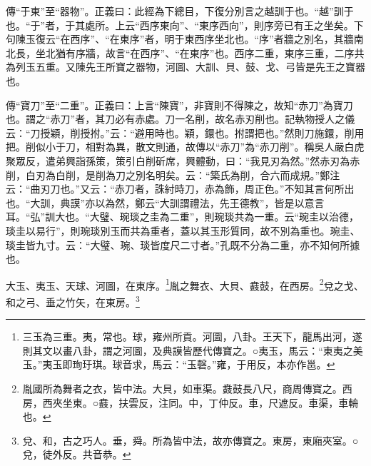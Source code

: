 {\noindent\zhuan{}\fzbyks 傳“于東”至“器物”。正義曰：此經為下總目，下復分別言之越訓于也。“越”訓于也。“于”者，于其處所。上云“西序東向”、“東序西向”，則序旁已有王之坐矣。下句陳玉復云“在西序”、“在東序”者，明于東西序坐北也。“序”者牆之別名，其牆南北長，坐北猶有序牆，故言“在西序”、“在東序”也。西序二重，東序三重，二序共為列玉五重。又陳先王所寶之器物，河圖、大訓、貝、鼓、戈、弓皆是先王之寶器也。 \par}

{\noindent\zhuan{}\fzbyks 傳“寶刀”至“二重”。正義曰：上言“陳寶”，非寶則不得陳之，故知“赤刀”為寶刀也。謂之“赤刀”者，其刀必有赤處。刀一名削，故名赤刃削也。記執物授人之儀云：“刀授穎，削授拊。”云：“避用時也。穎，鐶也。拊謂把也。”然則刀施鐶，削用把。削似小于刀，相對為異，散文則通，故傳以“赤刀”為“赤刀削”。稱吳人嚴白虎聚眾反，遣弟興詣孫策，策引白削斫席，興體動，曰：“我見刃為然。”然赤刃為赤削，白刃為白削，是削為刀之別名明矣。云：“築氏為削，合六而成規。”鄭注云：“曲刃刀也。”又云：“赤刀者，誅紂時刀，赤為飾，周正色。”不知其言何所出也。“大訓，典謨”亦以為然，鄭云“大訓謂禮法，先王德教”，皆是以意言耳。“弘”訓大也。“大璧、琬琰之圭為二重”，則琬琰共為一重。云“琬圭以治德，琰圭以易行”，則琬琰別玉而共為重者，蓋以其玉形質同，故不別為重也。琬圭、琰圭皆九寸。云：“大璧、琬、琰皆度尺二寸者。”孔既不分為二重，亦不知何所據也。 \par}

大玉、夷玉、天球、河圖，在東序。\footnote{三玉為三重。夷，常也。球，雍州所貢。河圖，八卦。王天下，龍馬出河，遂則其文以畫八卦，謂之河圖，及典謨皆歷代傳寶之。○夷玉，馬云：“東夷之美玉。”夷玉即珣玗琪。球音求，馬云：“玉磬。”雍，于用反，本亦作邕。}胤之舞衣、大貝、鼖鼓，在西房。\footnote{胤國所為舞者之衣，皆中法。大貝，如車渠。鼖鼓長八尺，商周傳寶之。西房，西夾坐東。○鼖，扶雲反，注同。中，丁仲反。車，尺遮反。車渠，車輈也。}兌之戈、和之弓、垂之竹矢，在東房。\footnote{兌、和，古之巧人。垂，舜。所為皆中法，故亦傳寶之。東房，東廂夾室。○兌，徒外反。共音恭。}



